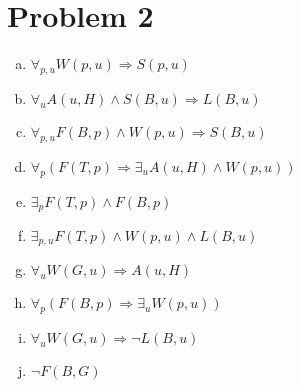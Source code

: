 \documentclass[11pt]{article}
\begin{document}
	\section*{Problem 2}
	\begin{enumerate}[a.]
		\item $ \forall_{p,u} W(p,u)\Rightarrow S(p,u) $
		\item $ \forall_uA(u,H)\wedge S(B,u)\Rightarrow L(B,u) $
		\item $ \forall_{p,u}F(B,p)\wedge W(p,u)\Rightarrow S(B,u) $
		\item $ \forall_p(F(T,p)\Rightarrow \exists_u A(u,H)\wedge W(p,u)) $
		\item $ \exists_p F(T,p)\wedge F(B,p) $
		\item $ \exists_{p,u} F(T,p)\wedge W(p,u)\wedge L(B,u) $
		\item $ \forall_u W(G,u)\Rightarrow A(u,H) $
		\item $ \forall_p (F(B,p)\Rightarrow \exists_u W(p,u)) $
		\item $ \forall_u W(G,u)\Rightarrow \neg L(B,u) $
		\item $ \neg F(B,G) $
	\end{enumerate}
\end{document}
